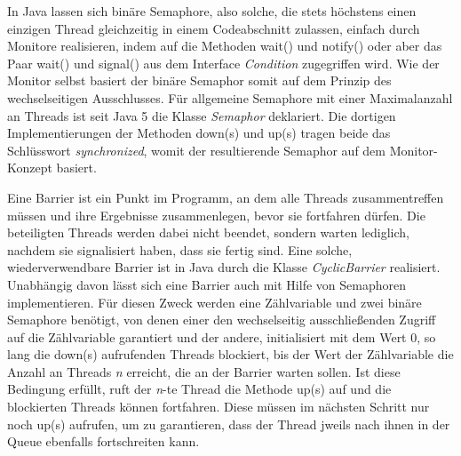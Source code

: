 \documentclass[12pt, onecolumn,notitlepage]{scrartcl}
\begin{document}
In Java lassen sich binäre Semaphore, also solche, die stets höchstens einen einzigen Thread gleichzeitig in einem Codeabschnitt zulassen, einfach durch Monitore realisieren, indem auf die Methoden wait() und notify() oder aber das Paar wait() und signal() aus dem Interface \textit{Condition} zugegriffen wird. %
Wie der Monitor selbst basiert der binäre Semaphor somit auf dem Prinzip des wechselseitigen Ausschlusses.\cite{rheinwerk} Für allgemeine Semaphore mit einer Maximalanzahl an Threads ist seit Java 5 die Klasse \textit{Semaphor} deklariert. Die dortigen Implementierungen der Methoden down(s) und up(s) tragen beide das Schlüsswort \textit{synchronized}, womit der resultierende Semaphor auf dem Monitor-Konzept basiert.\cite{semaphorj} \par
Eine Barrier ist ein Punkt im Programm, an dem alle Threads zusammentreffen müssen und ihre Ergebnisse zusammenlegen, bevor sie fortfahren dürfen. Die beteiligten Threads werden dabei nicht beendet, sondern warten lediglich, nachdem sie signalisiert haben, dass sie fertig sind. Eine solche, wiederverwendbare Barrier ist in Java durch die Klasse \textit{CyclicBarrier} realisiert.\cite{rheinwerk} Unabhängig davon lässt sich eine Barrier auch mit Hilfe von Semaphoren implementieren. Für diesen Zweck werden eine Zählvariable und zwei binäre Semaphore benötigt, von denen einer den wechselseitig ausschließenden Zugriff auf die Zählvariable garantiert und der andere, initialisiert mit dem Wert 0, so lang die down(s) aufrufenden Threads blockiert, bis der Wert der Zählvariable die Anzahl an Threads \textit{n} erreicht, die an der Barrier warten sollen. Ist diese Bedingung erfüllt, ruft der \textit{n}-te Thread die Methode up(s) auf und die blockierten Threads können fortfahren. Diese müssen im nächsten Schritt nur noch up(s) aufrufen, um zu garantieren, dass der Thread jweils nach ihnen in der Queue ebenfalls fortschreiten kann.\cite{semaphor}
\end{document}
